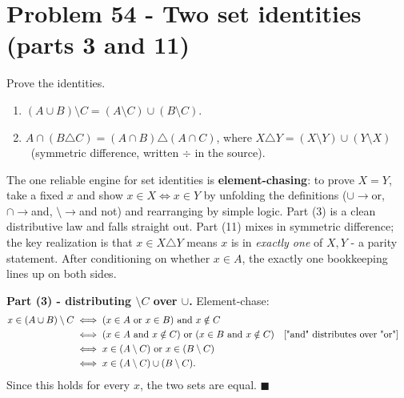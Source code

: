 \documentclass[11pt,a4paper]{article}
\newcommand{\symd}{\triangle}          %
\begin{document}
\section*{Problem 54 - Two set identities (parts 3 and 11)}

\begin{problembox}[54]
Prove the identities.
\begin{enumerate}[label=\textbf{(\arabic*)},leftmargin=1.4cm]
\item[\textbf{(3)}] $(A\cup B)\setminus C=(A\setminus C)\cup(B\setminus C)$.
\item[\textbf{(11)}] $A\cap(B\symd C)=(A\cap B)\symd(A\cap C)$, \quad where
$X\symd Y=(X\setminus Y)\cup(Y\setminus X)$ \ (symmetric difference, written $\div$ in the source).
\end{enumerate}
\end{problembox}

\begin{ideabox}
The one reliable engine for set identities is \textbf{element-chasing}: to prove $X=Y$, take a
fixed $x$ and show $x\in X\Leftrightarrow x\in Y$ by unfolding the definitions
($\cup\to$\textquotedbl{}or\textquotedbl{}, $\cap\to$\textquotedbl{}and\textquotedbl{},
$\setminus\to$\textquotedbl{}and not\textquotedbl{}) and rearranging by simple logic. Part (3) is a
clean distributive law and falls straight out. Part (11) mixes in symmetric difference; the key
realization is that $x\in X\symd Y$ means \textquotedbl{}$x$ is in \emph{exactly one} of
$X,Y$\textquotedbl{} - a parity statement. After conditioning on whether $x\in A$, the
\textquotedbl{}exactly one\textquotedbl{} bookkeeping lines up on both sides.
\end{ideabox}

\textbf{Part (3) - distributing $\setminus C$ over $\cup$.}
Element-chase:
\begin{align*}
x\in(A\cup B)\setminus C
&\iff (x\in A\ \text{or}\ x\in B)\ \text{and}\ x\notin C\\
&\iff (x\in A\ \text{and}\ x\notin C)\ \text{or}\ (x\in B\ \text{and}\ x\notin C)
   &&\text{[\textquotedbl{}and\textquotedbl{} distributes over \textquotedbl{}or\textquotedbl{}]}\\
&\iff x\in(A\setminus C)\ \text{or}\ x\in(B\setminus C)\\
&\iff x\in(A\setminus C)\cup(B\setminus C).
\end{align*}
Since this holds for every $x$, the two sets are equal. $\blacksquare$
\end{document}
